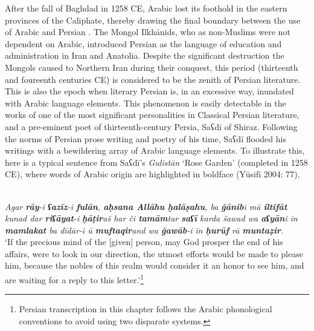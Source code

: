 \documentclass[output=paper]{langsci/langscibook}
\begin{document}
After the fall of Baghdad in 1258 CE, Arabic lost its foothold in the eastern provinces of the Caliphate, thereby drawing the final boundary between the use of Arabic and Persian \citep{Danner2000}. The Mongol Ilkhānids, who as non-Muslims were not dependent on Arabic, introduced Persian as the language of education and administration in Iran and Anatolia. Despite the significant destruction the Mongols caused to Northern Iran during their conquest, this period (thirteenth and foureenth centuries CE) is considered to be the zenith of Persian literature. This is also the epoch when literary Persian is, in an excessive way, inundated with Arabic language elements. This phenomenon is easily detectable in the works of one of the most significant personalities in Classical Persian literature, and a pre-eminent poet of thirteenth-century Persia, Saʕdī of Shiraz. Following the norms of Persian prose writing and poetry of his time, Saʕdī flooded his writings with a bewildering array of Arabic language elements. To illustrate this, here is a typical sentence from Saʕdī’s \textit{Gulistān} ‘Rose Garden’ (completed in 1258 CE), where words of Arabic origin are highlighted in boldface (Yūsifī 2004: 77).


\ea
{}\\
{\itshape Agar \textbf{rāy}-i \textbf{ʕazīz}-i \textbf{fulān}, \textbf{aḥsana Allāhu ḫalāṣahu}, ba \textbf{ǧānib}i mā \textbf{iltifāt} kunad dar \textbf{riʕāyat}-i \textbf{ḫāṭir}aš har či \textbf{tamām}tar \textbf{saʕī}  karda  šawad wa \textbf{aʕyān}i īn \textbf{mamlakat} ba dīdār-i ū \textbf{muftaqir}and wa \textbf{ǧawāb}-i īn \textbf{ḥurūf} rā \textbf{muntaẓir}.}\\
\glt ‘If the precious mind of the [given] person, may God prosper the end of his affairs, were to look in our direction, the utmost efforts would be made to please him, because the nobles of this realm would consider it an honor to see him, and are waiting for a reply to this letter.’\footnote{Persian transcription in this chapter follows the Arabic phonological conventions to avoid using two disparate systems.}
\z
\end{document}
